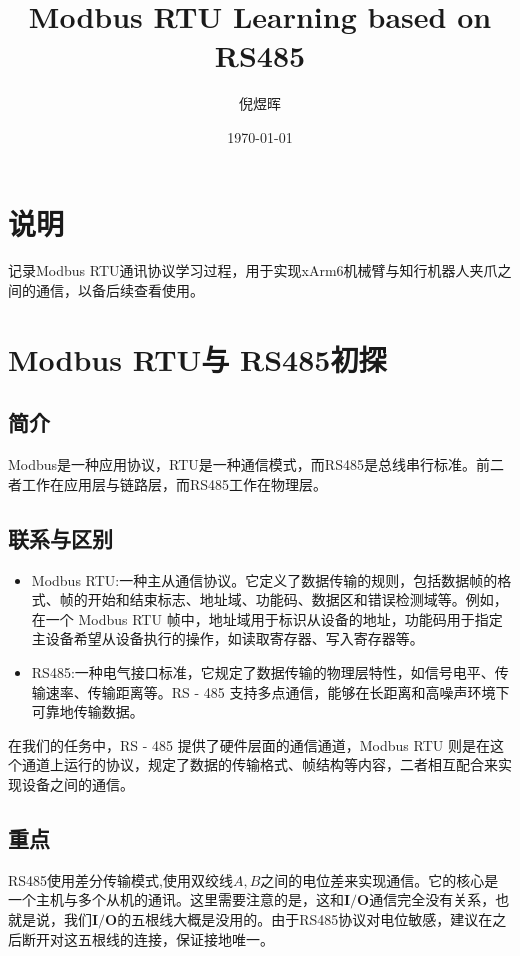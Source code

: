 \documentclass[UTF8]{ctexart}
\title{Modbus RTU Learning based on RS485}
\author{倪煜晖}
\date{\today}
\begin{document}
\maketitle

\tableofcontents

\section{说明}
记录Modbus RTU通讯协议学习过程，用于实现xArm6机械臂与知行机器人夹爪之间的通信，以备后续查看使用。

\section{Modbus RTU与 RS485初探}

\subsection{简介}
Modbus是一种应用协议，RTU是一种通信模式，而RS485是总线串行标准。前二者工作在应用层与链路层，而RS485工作在物理层。

\subsection{联系与区别}
\begin{itemize}
    \item Modbus RTU:一种主从通信协议。它定义了数据传输的规则，包括数据帧的格式、帧的开始和结束标志、地址域、功能码、数据区和错误检测域等。例如，在一个 Modbus RTU 帧中，地址域用于标识从设备的地址，功能码用于指定主设备希望从设备执行的操作，如读取寄存器、写入寄存器等。
    \item RS485:一种电气接口标准，它规定了数据传输的物理层特性，如信号电平、传输速率、传输距离等。RS - 485 支持多点通信，能够在长距离和高噪声环境下可靠地传输数据。
\end{itemize}

在我们的任务中，RS - 485 提供了硬件层面的通信通道，Modbus RTU 则是在这个通道上运行的协议，规定了数据的传输格式、帧结构等内容，二者相互配合来实现设备之间的通信。

\subsection{重点}
RS485使用差分传输模式,使用双绞线$A,B$之间的电位差来实现通信。它的核心是一个主机与多个从机的通讯。这里需要注意的是，这和$\textbf{I/O}$通信完全没有关系，也就是说，我们$\textbf{I/O}$的五根线大概是没用的。由于RS485协议对电位敏感，建议在之后断开对这五根线的连接，保证接地唯一。
\end{document}
